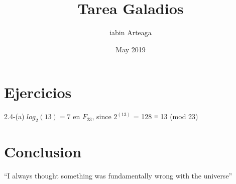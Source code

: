 \documentclass{article}
\title{Tarea Galadios}
\author{iabin Arteaga}
\date{May 2019}
\begin{document}
\maketitle

\section{Ejercicios}
2.4-(a) $log_2(13) = 7$ en $F_23$, since $2^(13)$ = 128 ≡ 13 (mod 23)



\section{Conclusion}
``I always thought something was fundamentally wrong with the universe'' \citep{adams1995hitchhiker}



\end{document}
